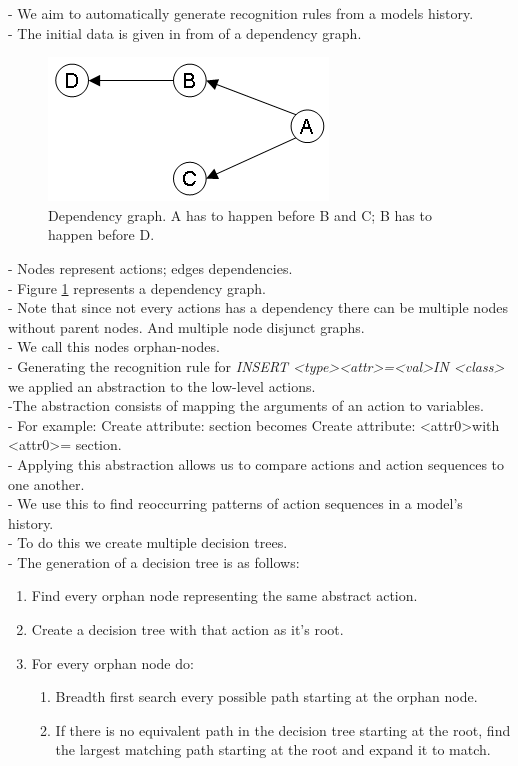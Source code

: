 \documentclass[10pt,a4paper,oneside]{scrartcl}
\begin{document}
- We aim to automatically generate recognition rules from a models history.
\\
- The initial data is given in from of a dependency graph.
\\
\begin{figure}
	\centering
	\includegraphics{./res/Dependencygraph.png}
	\caption{Dependency graph. A has to happen before B and C; B has to happen before D.}
	\label{fig:depgraph}
\end{figure}
- Nodes represent actions; edges dependencies.
\\
- Figure \ref{fig:depgraph} represents a dependency graph.
\\
- Note that since not every actions has a dependency there can be multiple nodes without parent nodes. And multiple node disjunct graphs.
\\
- We call this nodes orphan-nodes.
\\
- Generating the recognition rule for \textit{INSERT \textless type\textgreater \textless attr\textgreater=\textless val\textgreater IN \textless class\textgreater} we applied an abstraction to the low-level actions.
\\
-The abstraction consists of mapping the arguments of an action to variables.
\\
- For example: Create attribute: section becomes Create attribute: \textless attr0\textgreater with \textless attr0\textgreater = section.
\\
- Applying this abstraction allows us to compare actions and action sequences to one another.
\\
- We use this to find reoccurring patterns of action sequences in a model's history.
\\
- To do this we create multiple decision trees.
\\
- The generation of a decision tree is as follows:
\begin{enumerate}
	\item Find every orphan node representing the same abstract action.
	\item Create a decision tree with that action as it's root.
	\item For every orphan node do:
	\begin{enumerate}
		\item Breadth first search every possible path starting at the orphan node.
		\item If there is no equivalent path in the decision tree starting at the root, find the largest matching path starting at the root and expand it to match.
	\end{enumerate}
\end{enumerate}
\end{document}
